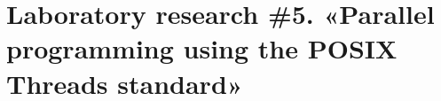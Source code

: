 { %
	\section{Laboratory research \#5. «Parallel programming using the POSIX Threads standard»}
	
	
	
}
